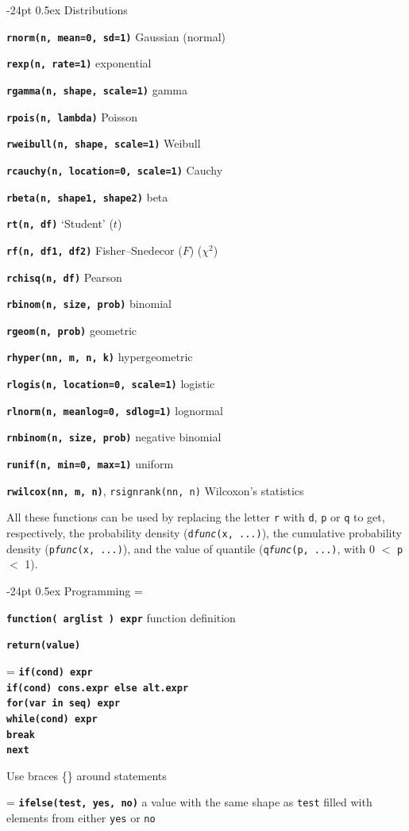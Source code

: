 \documentclass[10pt,landscape]{article}
\makeatletter
\renewcommand\section{\@startsection{section}{1}{0mm}%
                                     {-24pt}%
                                     {0.5ex}%
                                {\color[rgb]{1,0.54902,0}\normalfont\large\bfseries}}
\newcommand{\code}{\texttt}
\newcommand{\bcode}[1]{\texttt{\textbf{#1}}}
\makeatother
\begin{document}
\begin{multicols*}{3}
\section{Distributions}

\bcode{rnorm(n, mean=0, sd=1)} Gaussian (normal)  

\bcode{rexp(n, rate=1)} exponential

\bcode{rgamma(n, shape, scale=1)} gamma  

\bcode{rpois(n, lambda)} Poisson

\bcode{rweibull(n, shape, scale=1)} Weibull

\bcode{rcauchy(n, location=0, scale=1)} Cauchy  

\bcode{rbeta(n, shape1, shape2)} beta

\bcode{rt(n, df)} `Student' ($t$)  

\bcode{rf(n, df1, df2)} Fisher--Snedecor ($F$)  ($\chi^2$)  

\bcode{rchisq(n, df)} Pearson 

\bcode{rbinom(n, size, prob)} binomial  

\bcode{rgeom(n, prob)} geometric  

\bcode{rhyper(nn, m, n, k)} hypergeometric  

\bcode{rlogis(n, location=0, scale=1)} logistic  

\bcode{rlnorm(n, meanlog=0, sdlog=1)} lognormal  

\bcode{rnbinom(n, size, prob)} negative binomial  

\bcode{runif(n, min=0, max=1)} uniform  

\bcode{rwilcox(nn, m, n)}, \code{rsignrank(nn, n)} Wilcoxon's statistics  

All these functions can be used by replacing the letter \code{r} with
\code{d}, \code{p} or \code{q} to get, respectively, the probability
density (\code{d\textsl{func}(x, ...)}), the cumulative probability
density (\code{p\textsl{func}(x, ...)}), and the value of quantile
(\code{q\textsl{func}(p, ...)}, with 0 $<$ \code{p} $<$ 1).


\section{Programming}
\everypar={\hangindent=9mm}

\bcode{function( arglist ) expr} function definition

\bcode{return(value)}

\everypar={\hangindent=0mm}
\bcode{if(cond) expr\\
if(cond) cons.expr  else  alt.expr\\
for(var in seq) expr\\
while(cond) expr\\
break\\
next}

Use braces \{\} around statements


\everypar={\hangindent=9mm}
\bcode{ifelse(test, yes, no)} a value with the same shape as \code{test} filled with elements
from either \code{yes} or \code{no} 


\end{multicols*}
\end{document}
